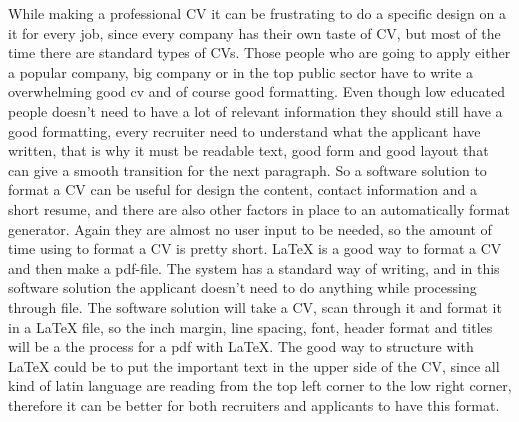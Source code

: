 While making a professional CV it can be frustrating to do a specific design on a it for every job, 
since every company has their own taste of CV, but most of the time there are standard types of CVs. 
Those people who are going to apply either a popular company, big company or
in the top public sector have to write a overwhelming good cv and of course good formatting.
Even though low educated people doesn't need to have a lot of relevant information they should still have a good formatting, 
every recruiter need to understand what the applicant have written, that is why it must be readable text, good form 
and good layout that can give a smooth transition for the next paragraph. 
So a software solution to format a CV can be useful for design the content, contact information and a short resume,
and there are also other factors in place to an automatically format generator. Again they are almost no user input to be needed, 
so the amount of time using to format a CV is pretty short. 
LaTeX is a good way to format a CV and then make a pdf-file. The system has a standard way of writing, and in this software solution
the applicant doesn't need to do anything while processing through file. The software solution will take a CV, scan through it and
format it in a LaTeX file, so the inch margin, line spacing, font, header format and titles 
will be a the process for a pdf with LaTeX. 
The good way to structure with LaTeX could be to put the important text in the upper side of the CV, 
since all kind of latin language are reading from the top left corner to the low right corner, therefore it can be better
for both recruiters and applicants to have this format.
